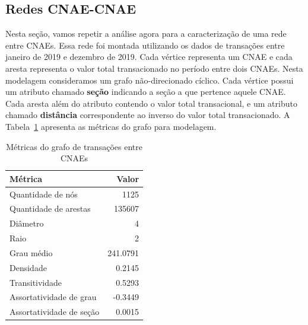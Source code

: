 \subsection{Redes CNAE-CNAE}
\label{section:metricas-redes:cnae}

Nesta seção, vamos repetir a análise agora para a caracterização de uma rede entre CNAEs. Essa rede foi montada utilizando os dados de transações entre janeiro de 2019 e dezembro de 2019. Cada vértice representa um CNAE e cada aresta representa o valor total transacionado no período entre dois CNAEs. Nesta modelagem consideramos um grafo não-direcionado cíclico. Cada vértice possui um atributo chamado \textbf{seção} indicando a seção a que pertence aquele CNAE. Cada aresta além do atributo contendo o valor total transacional, e um atributo chamado \textbf{distância} correspondente ao inverso do valor total transacionado. A Tabela~\ref{tab:metricas-redes:grafo-por-cnae} apresenta as métricas do grafo para modelagem.

\begin{table}[htb]
\centering
\caption{Métricas do grafo de transações entre CNAEs}
\label{tab:metricas-redes:grafo-por-cnae}
    \begin{tabular}{l|r}
    \toprule
    Métrica &  Valor \\
    \midrule
    Quantidade de nós         &   1125      \\
    Quantidade de arestas     & 135607      \\
    Diâmetro                  &      4      \\
    Raio                      &      2      \\
    Grau médio                &    241.0791 \\
    Densidade                 &      0.2145 \\
    Transitividade            &      0.5293 \\
    Assortatividade de grau   &     -0.3449 \\
    Assortatividade de seção &      0.0015 \\
    \bottomrule
    \end{tabular}
\fdadospesquisa
\end{table}



